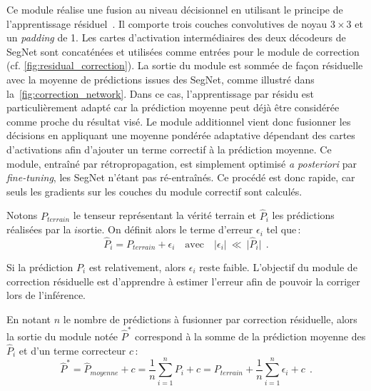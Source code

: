 Ce module réalise une fusion au niveau décisionnel en utilisant le principe de l'apprentissage résiduel~\cite{he_deep_2016}. Il comporte trois couches convolutives de noyau $3\times3$ et un \emph{padding} de \SI{1}{\px}. Les cartes d'activation intermédiaires des deux décodeurs de SegNet sont concaténées et utilisées comme entrées pour le module de correction (cf. \cref{fig:residual_correction}). La sortie du module est sommée de façon résiduelle avec la moyenne de prédictions issues des SegNet, comme illustré dans la~\cref{fig:correction_network}. Dans ce cas, l'apprentissage par résidu est particulièrement adapté car la prédiction moyenne peut déjà être considérée comme proche du résultat visé. Le module additionnel vient donc fusionner les décisions en appliquant une moyenne pondérée adaptative dépendant des cartes d'activations afin d'ajouter un terme correctif à la prédiction moyenne. Ce module, entraîné par rétropropagation, est simplement optimisé \emph{a posteriori} par \emph{fine-tuning}, les SegNet n'étant pas ré-entraînés. Ce procédé est donc rapide, car seuls les gradients sur les couches du module correctif sont calculés.



Notons $P_\mathit{terrain}$ le tenseur représentant la vérité terrain et $\hat{P}_i$ les prédictions réalisées par la $i$\ieme sortie. On définit alors le terme d'erreur $\epsilon_i$ tel que\,:
\begin{equation}
\hat{P}_i = P_\mathit{terrain} + \epsilon_i \text{~~~avec~~~} \lvert \epsilon_i \lvert ~\ll~ \rvert \hat{P}_i \rvert~~.
\end{equation}

Si la prédiction $P_i$ est relativement, alors $\epsilon_i$ reste faible. L'objectif du module de correction résiduelle est d'apprendre à estimer l'erreur afin de pouvoir la corriger lors de l'inférence.

En notant $n$ le nombre de prédictions à fusionner par correction résiduelle, alors la sortie du module notée $\hat{P}^*$ correspond à la somme de la prédiction moyenne des $\hat{P}_i$ et d'un terme correcteur $c$\,:
\begin{equation}
\hat{P}^* = \hat{P}_\mathit{moyenne} + c = \frac{1}{n} \sum_{i=1}^n P_i + c = P_\mathit{terrain} + \frac{1}{n} \sum_{i=1}^n \epsilon_i + c~~.
\label{eq:residual_correction}
\end{equation}

